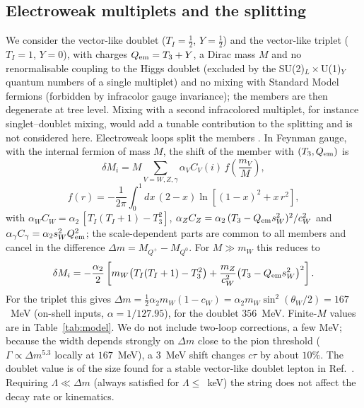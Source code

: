 \documentclass[prd,twocolumn,nofootinbib,superscriptaddress,amsmath,amssymb]{revtex4-2}
\begin{document}
\subsection{Electroweak multiplets and the splitting}
We consider the vector-like doublet ($T_I=\tfrac12$, $Y=\tfrac12$) and the vector-like triplet ($T_I=1$, $Y=0$), with charges $Q_{\rm em}=T_3+Y$, a Dirac mass $M$ and no renormalisable coupling to the Higgs doublet (excluded by the SU(2)$_L\times$U(1)$_Y$ quantum numbers of a single multiplet) and no mixing with Standard Model fermions (forbidden by infracolor gauge invariance); the members are then degenerate at tree level. Mixing with a second infracolored multiplet, for instance singlet--doublet mixing, would add a tunable contribution to the splitting and is not considered here. Electroweak loops split the members \cite{ThomasWells:1998,Cirelli:2005}. In Feynman gauge, with the internal fermion of mass $M$, the shift of the member with $(T_3,Q_{\rm em})$ is
\begin{equation}
\delta M_i = M\sum_{V=W,Z,\gamma}\alpha_V C_V(i)\, f\!\left(\frac{m_V}{M}\right),
\end{equation}
\begin{equation}
f(r)=-\frac{1}{2\pi}\int_0^1\!dx\,(2-x)\ln\!\left[(1-x)^2+x\,r^2\right],
\label{eq:dm}
\end{equation}
with $\alpha_WC_W=\alpha_2\,[T_I(T_I+1)-T_3^2]$, $\alpha_ZC_Z=\alpha_2\,(T_3-Q_{\rm em}s_W^2)^2/c_W^2$ and $\alpha_\gamma C_\gamma=\alpha_2 s_W^2Q_{\rm em}^2$; the scale-dependent parts are common to all members and cancel in the difference $\Delta m=M_{Q^+}-M_{Q^0}$. For $M\gg m_W$ this reduces to
\begin{equation}
\delta M_i=-\frac{\alpha_2}{2}\left[m_W\big(T_I(T_I+1)-T_3^2\big)+\frac{m_Z}{c_W^2}\big(T_3-Q_{\rm em}s_W^2\big)^2\right].
\label{eq:dmasym}
\end{equation}
For the triplet this gives $\Delta m=\tfrac12\alpha_2 m_W(1-c_W)=\alpha_2 m_W\sin^2(\theta_W/2)=167$~MeV (on-shell inputs, $\alpha=1/127.95$), for the doublet $356$~MeV. Finite-$M$ values are in Table~\ref{tab:model}. We do not include two-loop corrections, a few MeV; because the width depends strongly on $\Delta m$ close to the pion threshold ($\Gamma\propto\Delta m^{5.3}$ locally at $167$~MeV), a $3$~MeV shift changes $c\tau$ by about $10\%$. The doublet value is of the size found for a stable vector-like doublet lepton in Ref.~\cite{ThomasWells:1998}. Requiring $\Lambda\ll\Delta m$ (always satisfied for $\Lambda\le$~keV) the string does not affect the decay rate or kinematics.
\end{document}
